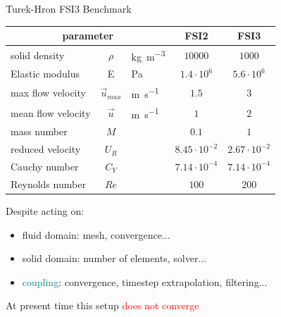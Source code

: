 \documentclass[10pt,t]{beamer}
\begin{document}
\begin{frame}{Turek-Hron FSI3 Benchmark}

\footnotesize
\begin{center}
\begin{tabular}{ l c l | c | c } 
	\multicolumn{3}{c|}{parameter} & FSI2 & FSI3   \\ 
	\hline
	solid density  &  $\rho$ & \si{kg.m^{-3}} & $10000$ & $1000$     \\
	Elastic modulus  & E & \si{Pa} & $1.4\cdot 10^6$ & $5.6\cdot 10^6$   \\
	max flow velocity & $\vec{u}_{max}$ & \si{m.s^{-1}} & $1.5$ & $3$ \\
	mean flow velocity & $\vec{u}$ & \si{m.s^{-1}} & $1$ & $2$  \\
    \hline
    mass number  &  $M$ & & \cellcolor{red!10} $0.1$ & \cellcolor{red!10} $1$     \\
	reduced velocity & $U_R$ & & $8.45 \cdot 10^{-2}$  & $2.67\cdot 10^{-2}$  \\
	Cauchy number  & $C_Y$ & & \cellcolor{yellow!25}  $7.14\cdot 10^{-4}$  & \cellcolor{yellow!25} $7.14\cdot 10^{-4}$  \\
	Reynolds number & $Re$ & & $100$ & $200$ \\
\end{tabular}    
\end{center}
\normalsize
\vspace{0.5cm}
Despite acting on:
\begin{itemize}
    \item \textcolor{pblue}{fluid domain}: mesh, convergence...
    \item \textcolor{dorange}{solid domain}: number of elements, solver...
    \item \textcolor{teal}{coupling}: convergence, timestep extrapolation, filtering...
\end{itemize}
\vspace{0.5cm}
\large
At present time this setup \textcolor{red}{does not converge}
    
\end{frame}
\end{document}
